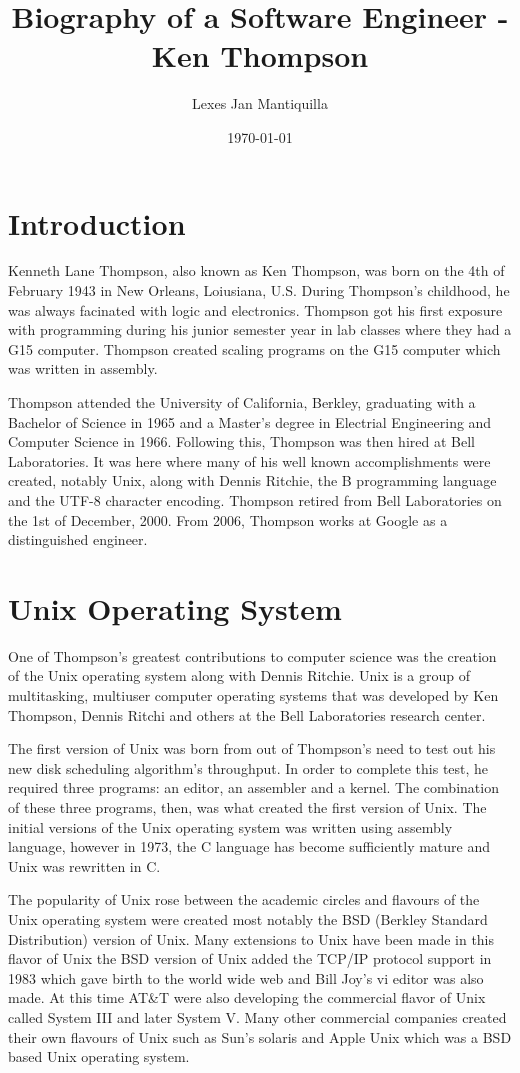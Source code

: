 \documentclass{article}
\title{Biography of a Software Engineer - Ken Thompson}
\author{Lexes Jan Mantiquilla}
\date{\today}
\begin{document}
\maketitle

\section{Introduction}
Kenneth Lane Thompson, also known as Ken Thompson, was born on the 4th of
February 1943 in New Orleans, Loiusiana, U.S. During Thompson's childhood, he
was always facinated with logic and electronics. Thompson got his first
exposure with programming during his junior semester year in lab classes
where they had a G15 computer. Thompson created scaling programs on the G15
computer which was written in assembly. \cite{seibel2009coders}

Thompson attended the University of California, Berkley, graduating with a
Bachelor of Science in 1965 and a Master's degree in Electrial Engineering and
Computer Science in 1966. Following this, Thompson was then hired at Bell
Laboratories. It was here where many of his well known accomplishments were
created, notably Unix, along with Dennis Ritchie, the B programming language and
the UTF-8 character encoding. Thompson retired from Bell Laboratories on the
1st of December, 2000. \cite{linfo} From 2006, Thompson works at Google as a
distinguished engineer.

\section{Unix Operating System}
One of Thompson's greatest contributions to computer science was the creation
of the Unix operating system along with Dennis Ritchie. Unix is a group of
multitasking, multiuser computer operating systems that was developed by Ken
Thompson, Dennis Ritchi and others at the Bell Laboratories research center.

The first version of Unix was born from out of Thompson's need to test out his
new disk scheduling algorithm's throughput. In order to complete this test, he
required three programs: an editor, an assembler and a kernel. The combination
of these three programs, then, was what created the first version of Unix.
\cite{VCF} The initial versions of the Unix operating system was written using
assembly language, however in 1973, the C language has become sufficiently
mature and Unix was rewritten in C. \cite{ritchie1979evolution}

The popularity of Unix rose between the academic circles and flavours of the
Unix operating system were created most notably the BSD (Berkley Standard
Distribution) version of Unix. Many extensions to Unix have been made in this
flavor of Unix the BSD version of Unix added the TCP/IP protocol support in
1983 \cite{unixorg} which gave birth to the world wide web and Bill Joy's vi
editor was also made. At this time AT\&T were also developing the commercial
flavor of Unix called System III and later System V. Many other commercial
companies created their own flavours of Unix such as Sun's solaris and Apple
Unix which was a BSD based Unix operating system.
\end{document}
